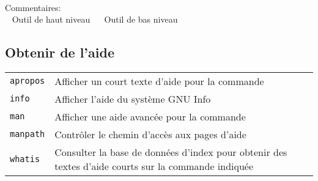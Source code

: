 \documentclass[10pt,a4paper]{article}
\begin{document}
\begin{multicols}{2}
~ \\
\noindent Commentaires: \\ ~ Outil de haut niveau ~ ~Outil de bas niveau

\end{multicols}

\newpage

\cheatsheet

\begin{multicols}{2}   

\section{Obtenir de l'aide}
\begin{tabular}{ p{2.5cm} p{8.5cm} }
  \hline
  \texttt{apropos} & Afficher un court texte d'aide pour la commande \\
  \rowcolor{Gray}
  \texttt{info} & Afficher l'aide du système GNU Info \\
  \texttt{man} & Afficher une aide avancée pour la commande \\
  \rowcolor{Gray}
  \texttt{manpath} & Contrôler le chemin d'accès aux pages d'aide \\
  \texttt{whatis} & Consulter la base de données d'index pour obtenir des textes d'aide courts sur la commande indiquée \\
  \hline
\end{tabular}

~ \\
\vfill


\end{multicols}
\end{document}
